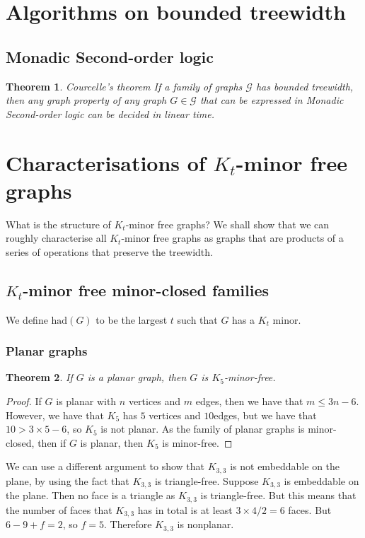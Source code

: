 \documentclass[]{article}
\newcommand{\had}{\text{had}}
\newtheorem{theorem}{Theorem}
\theoremstyle{definition}
\numberwithin{theorem}{section}
\numberwithin{equation}{section}
\begin{document}
\section{Algorithms on bounded treewidth}
\subsection{Monadic Second-order logic}
\begin{theorem}{Courcelle's theorem}
	If a family of graphs $\mathcal{G}$ has bounded treewidth, then any graph property of any graph $G \in \mathcal{G}$ that can be expressed in Monadic Second-order logic can be decided in linear time. 
\end{theorem}

\section{Characterisations of $K_t$-minor free graphs}
What is the structure of $K_t$-minor free graphs? We shall show that we can roughly characterise all $K_t$-minor free graphs as graphs that are products of a series of operations that preserve the treewidth. 
\subsection{$K_t$-minor free minor-closed families}
We define $\had(G)$ to be the largest $t$ such that $G$ has a $K_t$ minor. 
\subsubsection{Planar graphs}
\begin{theorem}
	If $G$ is a planar graph, then $G$ is $K_5$-minor-free.
\end{theorem}
\begin{proof}
	If $G$ is planar with $n$ vertices and $m$ edges, then we have that $m \leq 3n -6$. However, we have that $K_5$ has $5$ vertices and $10$edges, but we have that $ 10 > 3 \times 5 - 6$, so $K_5$ is not planar. As the family of planar graphs is minor-closed, then if $G$ is planar, then $K_5$ is minor-free.
\end{proof}

We can use a different argument to show that $K_{3,3}$ is not embeddable on the plane, by using the fact that $K_{3,3}$ is triangle-free. Suppose $K_{3,3}$ is embeddable on the plane. Then no face is a triangle as $K_{3,3}$ is triangle-free. But this means that the number of faces that $K_{3,3}$ has in total is at least $3 \times 4/2 = 6$ faces. But $6 - 9 + f = 2$, so $f = 5$. Therefore $K_{3,3}$ is nonplanar. 
\end{document}
